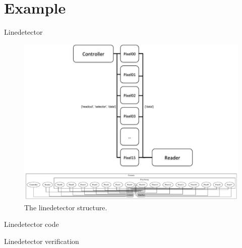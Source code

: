 \documentclass[11pt]{beamer}
\begin{document}



\section{Example}
%
\begin{frame}{Linedetector}
     \begin{figure}[!ht]
          \centering
          \includegraphics[scale=0.295]{figures/LineDetect.pdf}
          \caption{The linedetector structure.}
     \end{figure}
\end{frame}

\begin{frame}{Linedetector code}
\end{frame}

\begin{frame}{Linedetector verification}
\end{frame}
\end{document}
